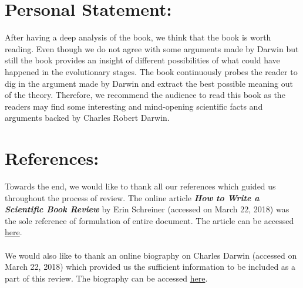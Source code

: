 \documentclass{article}
\begin{document}
\section*{Personal Statement:}
	After having a deep analysis of the book, we think that the book is worth reading. Even though we do not agree with some arguments made by Darwin but still the book provides an insight of different possibilities of what could have happened in the evolutionary stages. The book continuously probes the reader to dig in the argument made by Darwin and extract the best possible meaning out of the theory. Therefore, we recommend the audience to read this book as the readers may find some interesting and mind-opening scientific facts and arguments backed by Charles Robert Darwin. 

\section*{References:}
	Towards the end, we would like to thank all our references which guided us throughout the process of review. The online article \textbf{\textit{How to Write a Scientific Book Review}} by Erin Schreiner (accessed on March 22, 2018) was the sole reference of formulation of entire document. The article can be accessed \href{http://penandthepad.com/write-scientific-book-review-7762473.html}{here}. \\ \\
	We would also like to thank an online biography on Charles Darwin (accessed on March 22, 2018) which provided us the sufficient information to be included as a part of this review. The biography can be accessed \href{https://www.biography.com/people/charles-darwin-9266433}{here}. 

%
\end{document}
